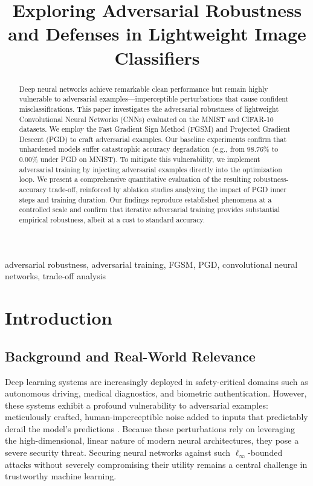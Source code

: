 \documentclass[conference,10pt]{IEEEtran}
\title{Exploring Adversarial Robustness and Defenses in Lightweight Image Classifiers}
\author{
    \IEEEauthorblockN{Mohamed Abdel Majid}
    \IEEEauthorblockA{\textit{Queen's University} \\
    Mohamed.Abdelmajid@queensu.ca}
    \and
    \IEEEauthorblockN{Mohamed Abdelkhalek}
    \IEEEauthorblockA{\textit{Queen's University} \\
    mohamed.abdelkhalek@queensu.ca}
    \and
    \IEEEauthorblockN{Osama Elkhuribi}
    \IEEEauthorblockA{\textit{Queen's University} \\
    osama.elkhuribi@queensu.ca}
}
\begin{document}
\maketitle

\begin{abstract}
Deep neural networks achieve remarkable clean performance but remain highly vulnerable to adversarial examples—imperceptible perturbations that cause confident misclassifications. This paper investigates the adversarial robustness of lightweight Convolutional Neural Networks (CNNs) evaluated on the MNIST and CIFAR-10 datasets. We employ the Fast Gradient Sign Method (FGSM) and Projected Gradient Descent (PGD) to craft adversarial examples. Our baseline experiments confirm that unhardened models suffer catastrophic accuracy degradation (e.g., from 98.76\% to 0.00\% under PGD on MNIST). To mitigate this vulnerability, we implement adversarial training by injecting adversarial examples directly into the optimization loop. We present a comprehensive quantitative evaluation of the resulting robustness-accuracy trade-off, reinforced by ablation studies analyzing the impact of PGD inner steps and training duration. Our findings reproduce established phenomena at a controlled scale and confirm that iterative adversarial training provides substantial empirical robustness, albeit at a cost to standard accuracy.
\end{abstract}

\begin{IEEEkeywords}
adversarial robustness, adversarial training, FGSM, PGD, convolutional neural networks, trade-off analysis
\end{IEEEkeywords}


\section{Introduction}

\subsection{Background and Real-World Relevance}
Deep learning systems are increasingly deployed in safety-critical domains such as autonomous driving, medical diagnostics, and biometric authentication. However, these systems exhibit a profound vulnerability to adversarial examples: meticulously crafted, human-imperceptible noise added to inputs that predictably derail the model's predictions \cite{szegedy2014, goodfellow2015fgsm}. Because these perturbations rely on leveraging the high-dimensional, linear nature of modern neural architectures, they pose a severe security threat. Securing neural networks against such $\ell_\infty$-bounded attacks without severely compromising their utility remains a central challenge in trustworthy machine learning.
\end{document}
